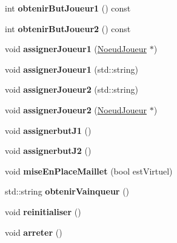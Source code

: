 \begin{DoxyCompactItemize}
\hypertarget{class_partie_ad863171d133de4e10d91d29dd617a8a3}{}\label{class_partie_ad863171d133de4e10d91d29dd617a8a3} 
int {\bfseries obtenir\+But\+Joueur1} () const
\item 
\hypertarget{class_partie_acab69753b80a060003dd947f7b8a42e8}{}\label{class_partie_acab69753b80a060003dd947f7b8a42e8} 
int {\bfseries obtenir\+But\+Joueur2} () const
\item 
\hypertarget{class_partie_a98a84b2b398056f218a584051cbaa927}{}\label{class_partie_a98a84b2b398056f218a584051cbaa927} 
void {\bfseries assigner\+Joueur1} (\hyperlink{class_noeud_joueur}{Noeud\+Joueur} $\ast$)
\item 
\hypertarget{class_partie_acd0cf884f2511e017631429416e6a81c}{}\label{class_partie_acd0cf884f2511e017631429416e6a81c} 
void {\bfseries assigner\+Joueur1} (std\+::string)
\item 
\hypertarget{class_partie_aa9f2fd5ffdb8b8103d6be3906a4a235a}{}\label{class_partie_aa9f2fd5ffdb8b8103d6be3906a4a235a} 
void {\bfseries assigner\+Joueur2} (std\+::string)
\item 
\hypertarget{class_partie_a19c706603646a1da6f58af464eea7c6e}{}\label{class_partie_a19c706603646a1da6f58af464eea7c6e} 
void {\bfseries assigner\+Joueur2} (\hyperlink{class_noeud_joueur}{Noeud\+Joueur} $\ast$)
\item 
\hypertarget{class_partie_a5a34bec74d0dde2bf60f8658dd8f2d3c}{}\label{class_partie_a5a34bec74d0dde2bf60f8658dd8f2d3c} 
void {\bfseries assignerbut\+J1} ()
\item 
\hypertarget{class_partie_aa95aa94fd0ee28fc7de2bde82d5bbdae}{}\label{class_partie_aa95aa94fd0ee28fc7de2bde82d5bbdae} 
void {\bfseries assignerbut\+J2} ()
\item 
\hypertarget{class_partie_a1fa7f4e295f58f9293318583bd20894c}{}\label{class_partie_a1fa7f4e295f58f9293318583bd20894c} 
void {\bfseries mise\+En\+Place\+Maillet} (bool est\+Virtuel)
\item 
\hypertarget{class_partie_af79c1062c8132d0ab1151f89129bc05a}{}\label{class_partie_af79c1062c8132d0ab1151f89129bc05a} 
std\+::string {\bfseries obtenir\+Vainqueur} ()
\item 
\hypertarget{class_partie_a628475fb6e8c88b686f12f5694899226}{}\label{class_partie_a628475fb6e8c88b686f12f5694899226} 
void {\bfseries reinitialiser} ()
\item 
\hypertarget{class_partie_ae8f33cf97ed68aef568a4c56ee7f9779}{}\label{class_partie_ae8f33cf97ed68aef568a4c56ee7f9779} 
void {\bfseries arreter} ()
\item 

\end{DoxyCompactItemize}
